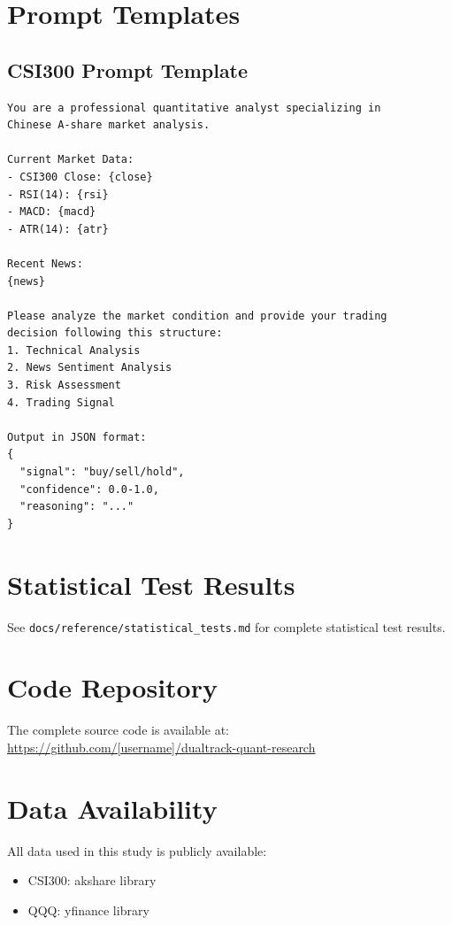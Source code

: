 \section{Prompt Templates}

\subsection{CSI300 Prompt Template}

\begin{verbatim}
You are a professional quantitative analyst specializing in
Chinese A-share market analysis.

Current Market Data:
- CSI300 Close: {close}
- RSI(14): {rsi}
- MACD: {macd}
- ATR(14): {atr}

Recent News:
{news}

Please analyze the market condition and provide your trading
decision following this structure:
1. Technical Analysis
2. News Sentiment Analysis
3. Risk Assessment
4. Trading Signal

Output in JSON format:
{
  "signal": "buy/sell/hold",
  "confidence": 0.0-1.0,
  "reasoning": "..."
}
\end{verbatim}

\section{Statistical Test Results}

See \texttt{docs/reference/statistical\_tests.md} for complete statistical test results.

\section{Code Repository}

The complete source code is available at:
\url{https://github.com/[username]/dualtrack-quant-research}

\section{Data Availability}

All data used in this study is publicly available:
\begin{itemize}
    \item CSI300: akshare library
    \item QQQ: yfinance library
\end{itemize}